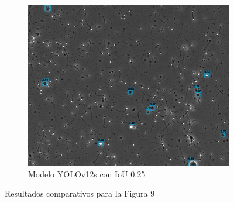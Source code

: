 \documentclass[12pt,a4paper,onecolumn,oneside]{report}
\begin{document}
\begin{figure}[H]
  \vspace{0.3cm}
  \begin{subfigure}[b]{0.48\textwidth}
    \centering
    \includegraphics[width=\textwidth]{figuras/evaluacion_cualitativa/9/9_v12_IoU0.25.jpg}
    \caption{Modelo YOLOv12s con IoU 0.25}
    \label{figyolov12s_IoU0.25_image_9}
  \end{subfigure}

  \caption{Resultados comparativos para la Figura 9}
  \label{fig:9}
\end{figure}
\end{document}

